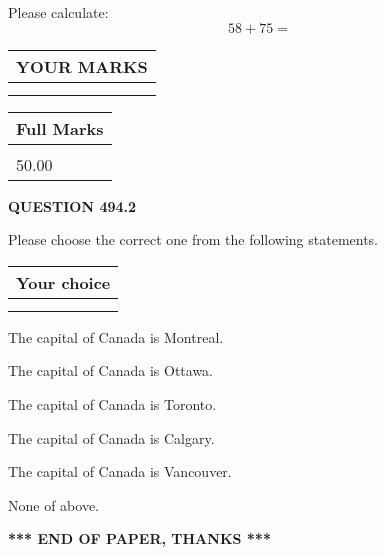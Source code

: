 \documentclass[12pt]{article}
\begin{document}
  
 
Please calculate:
\begin{equation}
58 +  %
75 = \nonumber
\end{equation}
 

 

 
  
\vspace{0.2in}
  
\noindent\begin{tabular}{|l|}
\hline
 YOUR MARKS  \\
\hline
 \\ 
 \\ 
\hline
\end{tabular}
\hspace{0.05in} \begin{tabular}{|l|}
\hline
 Full Marks  \\
\hline
 \\ 
50.00 \\
\hline
\end{tabular}
{\textbf{\Large{QUESTION
494.2 
}}}
  
  
Please choose the correct one from the following statements.
  
  
\noindent\hspace{3.0in} \begin{tabular}{|l|}
\hline
Your choice \\
\hline
 \\ 
 \\ 
\hline
\end{tabular}
  
  
 
 
The capital of Canada is Montreal.
 
 
The capital of Canada is Ottawa.
 
 
The capital of Canada is Toronto.
 
 
The capital of Canada is Calgary.
 
 
The capital of Canada is Vancouver.
 
 
 None of above.
 
 
   
   
 \vspace{0.2in}
 
   
   
   
   
\vspace{1.0in} 
{\textbf{\large{ *** END OF PAPER, THANKS *** }}} 
   
\end{document}
